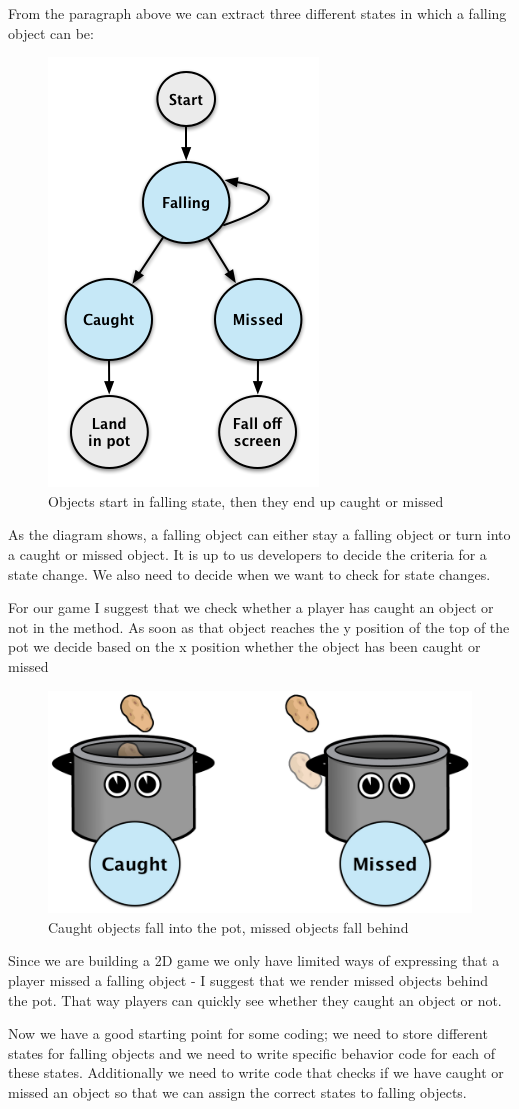From the paragraph above we can extract three different states in which a
falling object can be:
\begin{figure}[H]
		\centering
		\includegraphics[width=0.25\linewidth]{images/Chapter3/falling_object_states.png}
		\caption{Objects start in falling state, then they end up caught or missed}
\end{figure}
As the diagram shows, a falling object can either stay a falling object or turn
into a caught or missed object. It is up to us developers to decide the criteria
for a state change. We also need to decide when we want to check for state
changes.

For our game I suggest that we check whether a player has caught an object or
not in the  method. As soon as that object reaches the y
position of the top of the pot we decide based on the x position whether the
object has been caught or missed 
\begin{figure}[H]
		\centering
		\includegraphics[width=0.3\linewidth]{images/Chapter3/catch_test.png}
		\caption{Caught objects fall into the pot, missed objects fall behind}
		\label{CaughtMissedDefinition}
\end{figure}
Since we are building a 2D game we only have limited ways of expressing that a
player missed a falling object - I suggest that we render missed objects behind
the pot. That way players can quickly see whether they caught an object or not.

Now we have a good starting point for some coding; we need to store
different states for falling objects and we need to write specific behavior
code for each of these states. Additionally we need to write code that checks if
we have caught or missed an object so that we can assign the correct states to
falling objects.

